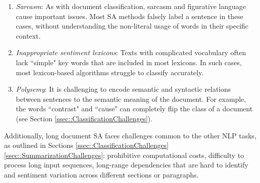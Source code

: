 \documentclass[preprint,review,10pt]{elsarticle}
\begin{document}
	\begin{enumerate}
		\item \textit{Sarcasm}: As with document classification, sarcasm and figurative language cause important issues. Most SA methods falsely label a sentence in these cases, without understanding the non-literal usage of words in their specific context.
		
		\item \textit{Inappropriate sentiment lexicons}: Texts with complicated vocabulary often lack ``simple" key words that are included in most lexicons. In such cases, most lexicon-based algorithms struggle to classify accurately.
		
		\item \textit{Polysemy}: It is challenging to encode semantic and syntactic relations between sentences to the semantic meaning of the document. For example, the words ``contrast" and ``cause" can completely flip the class of a document (see Section \ref{ssec::ClassificationChallenges}).
	\end{enumerate}
	
	Additionally, long document SA faces challenges common to the other NLP tasks, as outlined in Sections \ref{ssec::ClassificationChallenges} \ref{ssec::SummarizationChallenges}: prohibitive computational costs, difficulty to process long input sequences, long-range dependencies that are hard to identify and sentiment variation across different sections or paragraphs.
	
\end{document}

